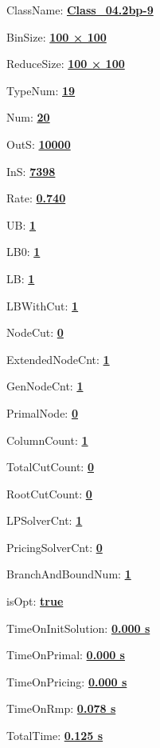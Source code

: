 \documentclass[11pt]{article}
\begin{document}
\pagestyle{empty}


ClassName: \underline{\textbf{Class_04.2bp-9}}
\par
BinSize: \underline{\textbf{100 × 100}}
\par
ReduceSize: \underline{\textbf{100 × 100}}
\par
TypeNum: \underline{\textbf{19}}
\par
Num: \underline{\textbf{20}}
\par
OutS: \underline{\textbf{10000}}
\par
InS: \underline{\textbf{7398}}
\par
Rate: \underline{\textbf{0.740}}
\par
UB: \underline{\textbf{1}}
\par
LB0: \underline{\textbf{1}}
\par
LB: \underline{\textbf{1}}
\par
LBWithCut: \underline{\textbf{1}}
\par
NodeCut: \underline{\textbf{0}}
\par
ExtendedNodeCnt: \underline{\textbf{1}}
\par
GenNodeCnt: \underline{\textbf{1}}
\par
PrimalNode: \underline{\textbf{0}}
\par
ColumnCount: \underline{\textbf{1}}
\par
TotalCutCount: \underline{\textbf{0}}
\par
RootCutCount: \underline{\textbf{0}}
\par
LPSolverCnt: \underline{\textbf{1}}
\par
PricingSolverCnt: \underline{\textbf{0}}
\par
BranchAndBoundNum: \underline{\textbf{1}}
\par
isOpt: \underline{\textbf{true}}
\par
TimeOnInitSolution: \underline{\textbf{0.000 s}}
\par
TimeOnPrimal: \underline{\textbf{0.000 s}}
\par
TimeOnPricing: \underline{\textbf{0.000 s}}
\par
TimeOnRmp: \underline{\textbf{0.078 s}}
\par
TotalTime: \underline{\textbf{0.125 s}}
\par
\newpage
\end{document}
